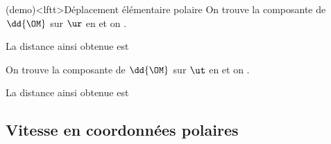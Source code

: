 \documentclass[../../main/main.tex]{subfiles}
\begin{document}
\begin{tcb}[sidebyside, righthand ratio=.40](demo)<lftt>{Déplacement élémentaire polaire}
	On trouve la composante de $\dd{\OM}$ sur $\ur$ en  et on
	.
	\begin{center}
		La distance ainsi obtenue est 
	\end{center}
	\bigbreak
	On trouve la composante de $\dd{\OM}$ sur $\ut$ en  et on
	.
	\begin{center}
		La distance ainsi obtenue est 
	\end{center}
	\tcblower
	\begin{center}
		\vspace{-15pt}
	\end{center}
\end{tcb}

\subsection{Vitesse en coordonnées polaires}
\end{document}
